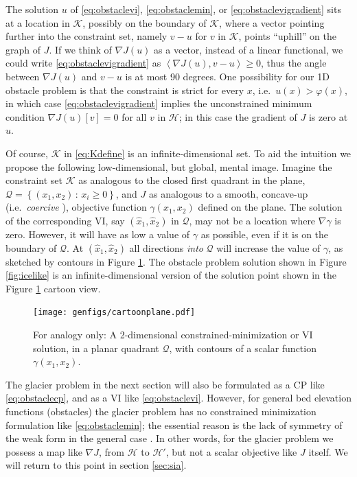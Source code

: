\documentclass[letterpaper,final,12pt,reqno]{amsart}
\theoremstyle{claim}
\newcommand{\grad}{\nabla}
\newcommand{\ip}[2]{\left<#1,#2\right>}
\numberwithin{equation}{section}
\numberwithin{figure}{section}
\numberwithin{table}{section}
\begin{document}
The solution $u$ of \eqref{eq:obstaclevi}, \eqref{eq:obstaclemin}, or \eqref{eq:obstaclevigradient} sits at a location in $\mathcal{K}$, possibly on the boundary of $\mathcal{K}$, where a vector pointing further into the constraint set, namely $v-u$ for $v$ in $\mathcal{K}$, points ``uphill'' on the graph of $J$.  If we think of $\nabla J(u)$ as a vector, instead of a linear functional, we could write \eqref{eq:obstaclevigradient} as $\ip{\nabla J(u)}{v-u} \ge 0$, thus the angle between $\nabla J(u)$ and $v-u$ is at most 90 degrees.  One possibility for our 1D obstacle problem is that the constraint is strict for every $x$, i.e.~$u(x) > \varphi(x)$, in which case \eqref{eq:obstaclevigradient} implies the unconstrained minimum condition $\nabla J(u)[v] = 0$ for all $v$ in $\mathcal{H}$; in this case the gradient of $J$ is zero at $u$.

Of course, $\mathcal{K}$ in \eqref{eq:Kdefine} is an infinite-dimensional set.  To aid the intuition we propose the following low-dimensional, but global, mental image.  Imagine the constraint set $\mathcal{K}$ as analogous to the closed first quadrant in the plane, $\mathcal{Q} = \left\{(x_1,x_2)\,:\,x_i\ge 0\right\}$, and $J$ as analogous to a smooth, concave-up (i.e.~\emph{coercive} \cite{Evans2010}), objective function $\gamma(x_1,x_2)$ defined on the plane.  The solution of the corresponding VI, say $(\hat x_1,\hat x_2)$ in $\mathcal{Q}$, may not be a location where $\nabla \gamma$ is zero.  However, it will have as low a value of $\gamma$ as possible, even if it is on the boundary of $\mathcal{Q}$.  At $(\hat x_1,\hat x_2)$ all directions \emph{into} $\mathcal{Q}$ will increase the value of $\gamma$, as sketched by contours in Figure \ref{fig:cartoonplane}.  The obstacle problem solution shown in Figure \ref{fig:icelike} is an infinite-dimensional version of the solution point shown in the Figure \ref{fig:cartoonplane} cartoon view.

\begin{figure}
\texttt{[image: genfigs/cartoonplane.pdf]}
\caption{For analogy only:  A 2-dimensional constrained-minimization or VI solution, in a planar quadrant $\mathcal{Q}$, with contours of a scalar function $\gamma(x_1,x_2)$.}
\label{fig:cartoonplane}
\end{figure}

The glacier problem in the next section will also be formulated as a CP like \eqref{eq:obstaclecp}, and as a VI like \eqref{eq:obstaclevi}.  However, for general bed elevation functions (obstacles) the glacier problem has no constrained minimization formulation like \eqref{eq:obstaclemin}; the essential reason is the lack of symmetry of the weak form in the general case \cite{JouvetBueler2012}.  In other words, for the glacier problem we possess a map like $\grad J$, from $\mathcal{H}$ to $\mathcal{H}'$, but not a scalar objective like $J$ itself.  We will return to this point in section \ref{sec:sia}.
\end{document}
